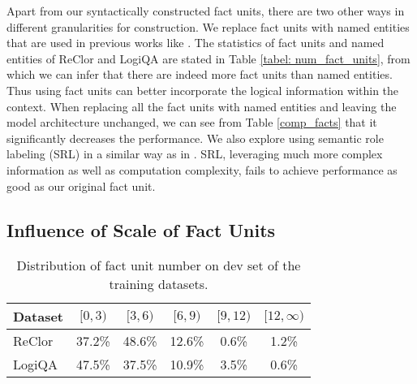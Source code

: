 \documentclass[11pt]{article}
\begin{document}
Apart from our syntactically constructed fact units, there are two other ways in different granularities for construction. We replace fact units with named entities that are used in previous works like \cite{Chen2019MultihopQA}. The statistics of fact units and named entities of ReClor and LogiQA are stated in Table \ref{tabel: num_fact_units}, from which we can infer that there are indeed more fact units than named entities. Thus using fact units can better incorporate the logical information within the context. When replacing all the fact units with named entities and leaving the model architecture unchanged, we can see from Table \ref{comp_facts} that it significantly decreases the performance. We also explore using semantic role labeling (SRL) in a similar way as in \cite{Zhong2020ReasoningOS}. SRL, leveraging much more complex information as well as computation complexity, fails to achieve performance as good as our original fact unit.





\subsection{Influence of Scale of Fact Units}

\begin{table}
\setlength{\belowcaptionskip}{5pt}
\vspace*{-2mm}
\centering\centering\setlength{\tabcolsep}{5.5pt}
\small
\begin{tabular}{lccccc}
\toprule
Dataset  & $[0,3)$ & $[3,6)$ & $[6,9)$ & $[9,12)$  & $[12, \infty)$ \\ 
\midrule
ReClor&37.2\%& 48.6\%  & 12.6\% & 0.6\%  & 1.2\% \\
LogiQA & 47.5\% & 37.5\%  & 10.9\% & 3.5\%  & 0.6\%\\
\bottomrule
\end{tabular}
\caption{Distribution of fact unit number on dev set of the training datasets.} 
\label{distribution}
\vspace*{-5mm}
\end{table}
\end{document}
